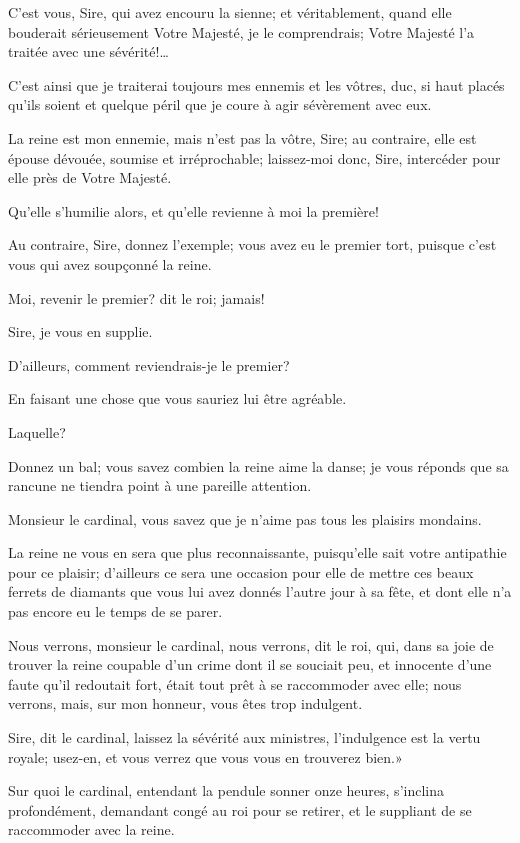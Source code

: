 \speak  C'est vous, Sire, qui avez encouru la sienne; et véritablement, quand elle bouderait sérieusement Votre Majesté, je le comprendrais; Votre Majesté l'a traitée avec une sévérité!\dots 

\speak  C'est ainsi que je traiterai toujours mes ennemis et les vôtres, duc, si haut placés qu'ils soient et quelque péril que je coure à agir sévèrement avec eux. 

\speak  La reine est mon ennemie, mais n'est pas la vôtre, Sire; au contraire, elle est épouse dévouée, soumise et irréprochable; laissez-moi donc, Sire, intercéder pour elle près de Votre Majesté. 

\speak  Qu'elle s'humilie alors, et qu'elle revienne à moi la première! 

\speak  Au contraire, Sire, donnez l'exemple; vous avez eu le premier tort, puisque c'est vous qui avez soupçonné la reine. 

\speak  Moi, revenir le premier? dit le roi; jamais! 

\speak  Sire, je vous en supplie. 

\speak  D'ailleurs, comment reviendrais-je le premier? 

\speak  En faisant une chose que vous sauriez lui être agréable. 

\speak  Laquelle? 

\speak  Donnez un bal; vous savez combien la reine aime la danse; je vous réponds que sa rancune ne tiendra point à une pareille attention. 

\speak  Monsieur le cardinal, vous savez que je n'aime pas tous les plaisirs mondains. 

\speak  La reine ne vous en sera que plus reconnaissante, puisqu'elle sait votre antipathie pour ce plaisir; d'ailleurs ce sera une occasion pour elle de mettre ces beaux ferrets de diamants que vous lui avez donnés l'autre jour à sa fête, et dont elle n'a pas encore eu le temps de se parer. 

\speak  Nous verrons, monsieur le cardinal, nous verrons, dit le roi, qui, dans sa joie de trouver la reine coupable d'un crime dont il se souciait peu, et innocente d'une faute qu'il redoutait fort, était tout prêt à se raccommoder avec elle; nous verrons, mais, sur mon honneur, vous êtes trop indulgent. 

\speak  Sire, dit le cardinal, laissez la sévérité aux ministres, l'indulgence est la vertu royale; usez-en, et vous verrez que vous vous en trouverez bien.» 

Sur quoi le cardinal, entendant la pendule sonner onze heures, s'inclina profondément, demandant congé au roi pour se retirer, et le suppliant de se raccommoder avec la reine. 

